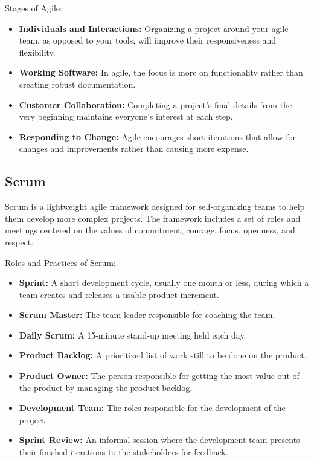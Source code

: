 \documentclass{article}
\begin{document}
Stages of Agile:
\begin{itemize}
    \item \textbf{Individuals and Interactions:} Organizing a project around your agile team, as opposed to your tools, will improve their responsiveness and flexibility.
    \item \textbf{Working Software:} In agile, the focus is more on functionality rather than creating robust documentation.
    \item \textbf{Customer Collaboration:} Completing a project's final details from the very beginning maintains everyone's interest at each step.
    \item \textbf{Responding to Change:} Agile encourages short iterations that allow for changes and improvements rather than causing more expense.
\end{itemize}

\subsection{Scrum}
Scrum is a lightweight agile framework designed for self-organizing teams to help them develop more complex projects. The framework includes a set of roles and meetings centered on the values of commitment, courage, focus, openness, and respect.

Roles and Practices of Scrum:
\begin{itemize}
    \item \textbf{Sprint:} A short development cycle, usually one month or less, during which a team creates and releases a usable product increment.
    \item \textbf{Scrum Master:} The team leader responsible for coaching the team.
    \item \textbf{Daily Scrum:} A 15-minute stand-up meeting held each day.
    \item \textbf{Product Backlog:} A prioritized list of work still to be done on the product.
    \item \textbf{Product Owner:} The person responsible for getting the most value out of the product by managing the product backlog.
    \item \textbf{Development Team:} The roles responsible for the development of the project.
    \item \textbf{Sprint Review:} An informal session where the development team presents their finished iterations to the stakeholders for feedback.
\end{itemize}
\end{document}
